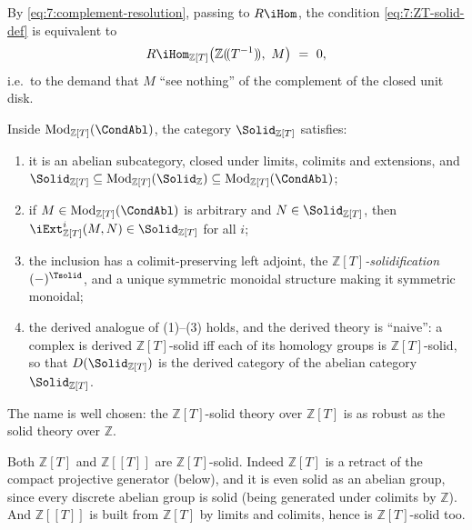 By \eqref{eq:7:complement-resolution}, passing to $R\iHom$, the condition
\eqref{eq:7:ZT-solid-def} is equivalent to
\begin{equation*}
R\iHom_{\mathbb{Z}[T]}\bigl(\mathbb{Z}(\!(T^{-1})\!),\ M\bigr)\ =\ 0,
\end{equation*}
i.e.\ to the demand that $M$ ``see nothing'' of the complement of the closed
unit disk.

\begin{theorem}
\label{thm:7:ZT-solid-structure}
Inside $\mathrm{Mod}_{\mathbb{Z}[T]}(\CondAbl)$, the category
$\Solid_{\mathbb{Z}[T]}$ satisfies:
\begin{enumerate}
\item it is an abelian subcategory, closed under limits, colimits and
extensions, and $\Solid_{\mathbb{Z}[T]}\subseteq\mathrm{Mod}_{\mathbb{Z}[T]}
(\Solid_{\mathbb{Z}})\subseteq\mathrm{Mod}_{\mathbb{Z}[T]}(\CondAbl)$;
\item if $M\in\mathrm{Mod}_{\mathbb{Z}[T]}(\CondAbl)$ is arbitrary and $N\in
\Solid_{\mathbb{Z}[T]}$, then $\iExt^{i}_{\mathbb{Z}[T]}(M,N)\in
\Solid_{\mathbb{Z}[T]}$ for all $i$;
\item the inclusion has a colimit-preserving left adjoint, the
\emph{$\mathbb{Z}[T]$-solidification} $(-)^{\Tsolid}$, and a unique symmetric
monoidal structure making it symmetric monoidal;
\item the derived analogue of \textup{(1)--(3)} holds, and the derived theory
is ``naive'': a complex is derived $\mathbb{Z}[T]$-solid iff each of its
homology groups is $\mathbb{Z}[T]$-solid, so that $D(\Solid_{\mathbb{Z}[T]})$
is the derived category of the abelian category $\Solid_{\mathbb{Z}[T]}$.
\end{enumerate}
\end{theorem}

The name is well chosen: the $\mathbb{Z}[T]$-solid theory over $\mathbb{Z}[T]$
is as robust as the solid theory over $\mathbb{Z}$.

\begin{remark}
\label{rmk:7:ZT-is-solid}
Both $\mathbb{Z}[T]$ and $\mathbb{Z}[\![T]\!]$ are $\mathbb{Z}[T]$-solid.
Indeed $\mathbb{Z}[T]$ is a retract of the compact projective generator (below),
and it is even solid as an abelian group, since every discrete abelian group is
solid (being generated under colimits by $\mathbb{Z}$). And $\mathbb{Z}[\![T]\!]$
is built from $\mathbb{Z}[T]$ by limits and colimits, hence is
$\mathbb{Z}[T]$-solid too.
\end{remark}

